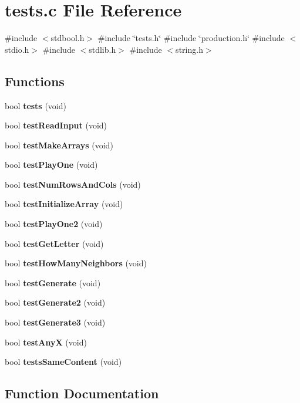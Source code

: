 \section{tests.\+c File Reference}
\label{tests_8c}
{\ttfamily \#include $<$stdbool.\+h$>$}\newline
{\ttfamily \#include \char`\"{}tests.\+h\char`\"{}}\newline
{\ttfamily \#include \char`\"{}production.\+h\char`\"{}}\newline
{\ttfamily \#include $<$stdio.\+h$>$}\newline
{\ttfamily \#include $<$stdlib.\+h$>$}\newline
{\ttfamily \#include $<$string.\+h$>$}\newline
\subsection*{Functions}
\begin{DoxyCompactItemize}
\item 
bool \textbf{ tests} (void)
\item 
bool \textbf{ test\+Read\+Input} (void)
\item 
bool \textbf{ test\+Make\+Arrays} (void)
\item 
bool \textbf{ test\+Play\+One} (void)
\item 
bool \textbf{ test\+Num\+Rows\+And\+Cols} (void)
\item 
bool \textbf{ test\+Initialize\+Array} (void)
\item 
bool \textbf{ test\+Play\+One2} (void)
\item 
bool \textbf{ test\+Get\+Letter} (void)
\item 
bool \textbf{ test\+How\+Many\+Neighbors} (void)
\item 
bool \textbf{ test\+Generate} (void)
\item 
bool \textbf{ test\+Generate2} (void)
\item 
bool \textbf{ test\+Generate3} (void)
\item 
bool \textbf{ test\+AnyX} (void)
\item 
bool \textbf{ tests\+Same\+Content} (void)
\end{DoxyCompactItemize}


\subsection{Function Documentation}
\mbox{\label{tests_8c_a9136792bde961164c06bcdde7ab1d5f5}} 
